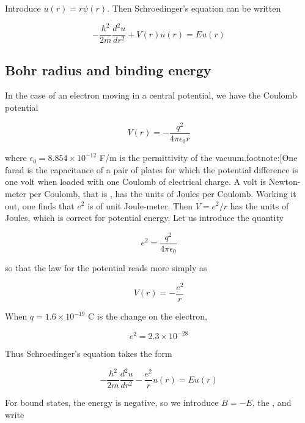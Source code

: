 Introduce $u(r) = r\psi(r)$.  Then Schroedinger's equation can be written

\begin{equation}
-\frac{\hbar^2}{2m} \frac{ d^2u }{ dr^2 } + V(r)u(r) = Eu(r)
\end{equation}

\subsection{Bohr radius and binding energy}

In the case of an electron moving in a central potential, we
have the Coulomb potential

\begin{equation}
V(r) = -\frac{q^2}{4\pi \epsilon_0 r}
\end{equation}

where $\epsilon_0 = 8.854\times 10^{-12}$ F/m is the permittivity of the vacuum.footnote:[One farad is the capacitance of a pair of plates for which the potential difference is one volt when loaded with one Coulomb of electrical charge.  A volt is Newton-meter per Coulomb, that is , has the units of Joules per Coulomb.  Working it out, one finds that $e^2$ is of unit Joule-meter.  Then $V = e^2/r$ has the units of Joules, which is correct for  potential energy.  Let us introduce the quantity

\begin{equation}
e^2 = \frac{q^2}{4\pi\epsilon_0}
\end{equation}

so that the law for the potential reads more simply as

\begin{equation}
V(r) = -\frac{e^2}{r}
\end{equation}

When $q = 1.6\times10^{-19}$ C is the change on the electron,

\begin{equation}
e^2 = 2.3\times10^{-28}
\end{equation}

Thus Schroedinger's equation takes the form

\begin{equation}
-\frac{\hbar^2}{2m} \frac{ d^2u }{ dr^2 } - \frac{e^2}{r}u(r) = Eu(r)
\end{equation}

For bound states, the energy is negative, so we introduce $B = -E$, the , and write

